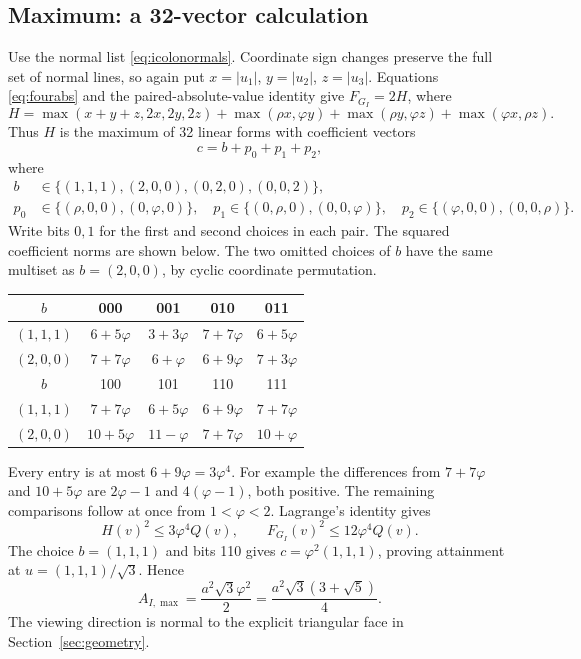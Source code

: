 \documentclass[11pt,a4paper]{article}
\newcommand{\ph}{\varphi}
\newcommand{\rr}{\rho}
\newcommand{\abs}[1]{\left|#1\right|}
\begin{document}
\subsection{Maximum: a 32-vector calculation}
Use the normal list \eqref{eq:icolonormals}. Coordinate sign changes preserve the full set of normal lines, so again put $x=\abs{u_1}$, $y=\abs{u_2}$, $z=\abs{u_3}$. Equations \eqref{eq:fourabs} and the paired-absolute-value identity give $F_{G_I}=2H$, where
\begin{equation}\label{eq:icoH}
 H=\max(x+y+z,2x,2y,2z)
  +\max(\rr x,\ph y)+\max(\rr y,\ph z)+\max(\ph x,\rr z).
\end{equation}
Thus $H$ is the maximum of 32 linear forms with coefficient vectors
\[
 c=b+p_0+p_1+p_2,
\]
where
\begin{align*}
 b&\in\{(1,1,1),(2,0,0),(0,2,0),(0,0,2)\},\\
 p_0&\in\{(\rr,0,0),(0,\ph,0)\},\quad
 p_1\in\{(0,\rr,0),(0,0,\ph)\},\quad
 p_2\in\{(\ph,0,0),(0,0,\rr)\}.
\end{align*}
Write bits $0,1$ for the first and second choices in each pair. The squared coefficient norms are shown below. The two omitted choices of $b$ have the same multiset as $b=(2,0,0)$, by cyclic coordinate permutation.
\begin{center}
\small\setlength{\tabcolsep}{4pt}\renewcommand{\arraystretch}{1.3}
\begin{tabular}{@{}c*{4}{c}@{}}\toprule
$b$&000&001&010&011\\\midrule
$(1,1,1)$&$6+5\ph$&$3+3\ph$&$7+7\ph$&$6+5\ph$\\
$(2,0,0)$&$7+7\ph$&$6+\ph$&$6+9\ph$&$7+3\ph$\\\midrule
$b$&100&101&110&111\\\midrule
$(1,1,1)$&$7+7\ph$&$6+5\ph$&$6+9\ph$&$7+7\ph$\\
$(2,0,0)$&$10+5\ph$&$11-\ph$&$7+7\ph$&$10+\ph$\\\bottomrule
\end{tabular}
\end{center}
Every entry is at most $6+9\ph=3\ph^4$. For example the differences from $7+7\ph$ and $10+5\ph$ are $2\ph-1$ and $4(\ph-1)$, both positive. The remaining comparisons follow at once from $1<\ph<2$. Lagrange's identity gives
\[
 H(v)^2\le3\ph^4Q(v),\qquad F_{G_I}(v)^2\le12\ph^4Q(v).
\]
The choice $b=(1,1,1)$ and bits 110 gives $c=\ph^2(1,1,1)$, proving attainment at $u=(1,1,1)/\sqrt3$. Hence
\[
 A_{I,\max}=\frac{a^2\sqrt3\ph^2}{2}
 =\frac{a^2\sqrt3(3+\sqrt5)}4.
\]
The viewing direction is normal to the explicit triangular face in Section~\ref{sec:geometry}.
\end{document}
